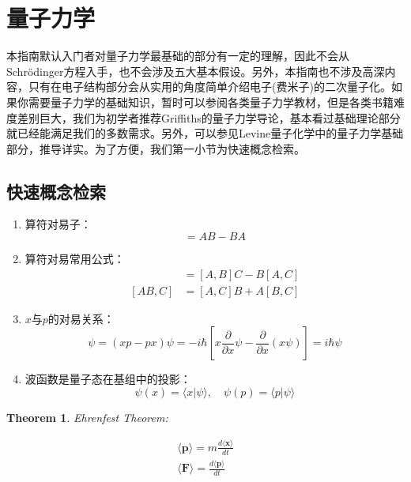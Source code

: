 \documentclass{article}
\newtheorem{theorem}{Theorem}[section]
\numberwithin{equation}{section}
\newcommand{\mean}[1]{\langle #1 \rangle}
\begin{document}
  \section{量子力学}
  本指南默认入门者对量子力学最基础的部分有一定的理解，因此不会从Schr\"odinger方程入手，也不会涉及五大基本假设。另外，本指南也不涉及高深内容，只有在电子结构部分会从实用的角度简单介绍电子(费米子)的二次量子化。如果你需要量子力学的基础知识，暂时可以参阅各类量子力学教材，但是各类书籍难度差别巨大，我们为初学者推荐Griffiths的量子力学导论，基本看过基础理论部分就已经能满足我们的多数需求。另外，可以参见Levine量子化学中的量子力学基础部分，推导详实。为了方便，我们第一小节为快速概念检索。

  \subsection{快速概念检索}
    \begin{enumerate}
    \item 算符对易子：
    \begin{equation}
    [A,B] = AB - BA
    \end{equation}

    \item 算符对易常用公式：
    \begin{align}
    [A,BC]& = [A,B]C - B[A,C]\\
    [AB,C]& = [A,C]B + A[B,C]
    \end{align}

    \item $x$与$p$的对易关系：
    \begin{equation}
    [x,p]\psi=(xp-px)\psi = -i\hbar[x \frac{\partial}{\partial x}\psi-\frac{\partial}{\partial x}(x\psi)]= i\hbar \psi
    \end{equation}

    \item 波函数是量子态在基组中的投影：
    \begin{equation}
    \psi (x) = \langle x | \psi \rangle , \quad \psi(p) = \langle p | \psi \rangle
    \end{equation} 
  \end{enumerate}
  

  \begin{theorem}
    Ehrenfest Theorem:
    
    \begin{align}
    \mean{\textbf{p}}= m \frac{d \mean{\textbf{x}}}{dt}\\
    \mean{\textbf{F}}= \frac{d\mean{\textbf{p}}}{dt}
    \end{align}
    \end{theorem}
\end{document}
